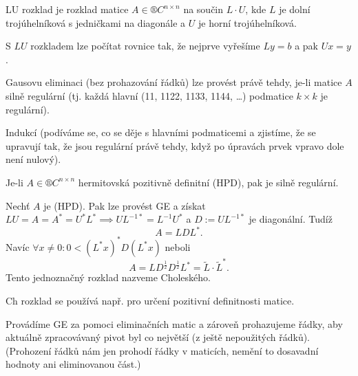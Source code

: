 \documentclass[12pt]{article}					%
\begin{document}
\begin{definice}[LU rozklad]
	LU rozklad je rozklad matice $A \in ®C^{n \times n}$ na součin $L·U$, kde $L$ je dolní trojúhelníková s jedničkami na diagonále a $U$ je horní trojúhelníková.
\end{definice}

\begin{poznamka}
	S $LU$ rozkladem lze počítat rovnice tak, že nejprve vyřešíme $Ly = b$ a pak $Ux = y$.
\end{poznamka}

\begin{veta}[O proveditelnosti GE]
	Gausovu eliminaci (bez prohazování řádků) lze provést právě tehdy, je-li matice $A$ silně regulární (tj. každá hlavní (11, 1122, 1133, 1144, …) podmatice $k \times k$ je regulární).

	\begin{dukazin}
		Indukcí (podíváme se, co se děje s hlavními podmaticemi a zjistíme, že se upravují tak, že jsou regulární právě tehdy, když po úpravách prvek vpravo dole není nulový).
	\end{dukazin}
\end{veta}

\begin{lemma}
	Je-li $A \in ®C^{n \times n}$ hermitovská pozitivně definitní (HPD), pak je silně regulární.
\end{lemma}

\begin{definice}
	Nechť $A$ je (HPD). Pak lze provést GE a získat $LU = A = A^* = U^*L^* \implies UL^{-1*} = L^{-1}U^*$ a $D := UL^{-1*}$ je diagonální. Tudíž
	$$ A = LDL^*. $$
	Navíc $\forall x ≠ 0: 0 < (L^*x)^* D(L^*x)$ neboli
	$$ A = LD^{\frac{1}{2}}D^{\frac{1}{2}}L^* = \tilde L· \tilde L^*. $$
	Tento jednoznačný rozklad nazveme Choleského.
\end{definice}

\begin{poznamka}
	Ch rozklad se používá např. pro určení pozitivní definitnosti matice.
\end{poznamka}

\begin{definice}
	Provádíme GE za pomoci eliminačních matic a zároveň prohazujeme řádky, aby aktuálně zpracovávaný pivot byl co největší (z ještě nepoužitých řádků). (Prohození řádků nám jen prohodí řádky v maticích, nemění to dosavadní hodnoty ani eliminovanou část.)
\end{definice}
\end{document}
